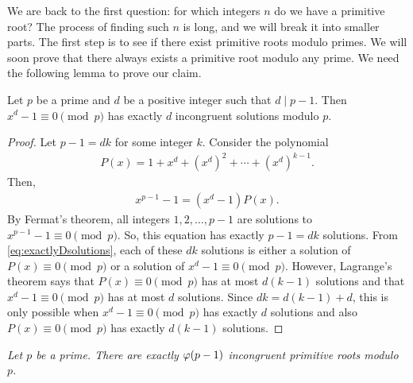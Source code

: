 \documentclass{subfile}
\begin{document}
We are back to the first question: for which integers $n$ do we have a primitive root? The process of finding such $n$ is long, and we will break it into smaller parts. The first step is to see if there exist primitive roots modulo primes. We will soon prove that there always exists a primitive root modulo any prime. We need the following lemma to prove our claim.
	
	\begin{lemma}\label{lem:exactlyDsolutions}
		Let $p$ be a prime and $d$ be a positive integer such that $d \mid p-1$. Then $x^d -1 \equiv 0 \pmod p$ has exactly $d$ incongruent solutions modulo $p$.
	\end{lemma}
	
	\begin{proof}
		Let $p-1=dk$ for some integer $k$. Consider the polynomial
			\begin{align*}
				P(x)= 1+x^d + \left(x^d\right)^2 + \cdots + \left(x^d\right)^{k-1}.
			\end{align*}
		Then,
			\begin{align}\label{eq:exactlyDsolutions}
				x^{p-1} -1 = (x^d-1)P(x).
			\end{align}
		By Fermat's theorem, all integers $1, 2, \ldots, p-1$ are solutions to $x^{p-1}-1 \equiv 0 \pmod p$. So, this equation has exactly $p-1=dk$ solutions. From \eqref{eq:exactlyDsolutions}, each of these $dk$ solutions is either a solution of $P(x) \equiv 0 \pmod p$ or a solution of $x^d-1 \equiv 0 \pmod p$. However, Lagrange's theorem says that $P(x) \equiv 0 \pmod p$ has at most $d(k-1)$ solutions and that $x^d-1 \equiv 0 \pmod p$ has at most $d$ solutions. Since $dk=d(k-1)+d$, this is only possible when $x^d-1 \equiv 0 \pmod p$ has exactly $d$ solutions and also $P(x) \equiv 0 \pmod p$ has exactly $d(k-1)$ solutions.
	\end{proof}

	\begin{theorem}\slshape\label{thm:primeprimitive}
		Let $p$ be a prime. There are exactly $\varphi(p-1)$ incongruent primitive roots modulo $p$.
	\end{theorem}
	
\end{document}
